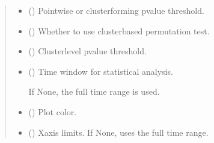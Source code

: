 \documentclass[letterpaper,10pt,english]{sphinxhowto}
\begin{document}
\begin{fulllineitems}
\begin{quote}
\begin{description}
\begin{itemize}
\item {} 
\sphinxAtStartPar
{} (\sphinxstyleliteralemphasis{\sphinxupquote{, }}) \textendash{} Point\sphinxhyphen{}wise or cluster\sphinxhyphen{}forming p\sphinxhyphen{}value threshold.

\item {} 
\sphinxAtStartPar
{} (\sphinxstyleliteralemphasis{\sphinxupquote{, }}) \textendash{} Whether to use cluster\sphinxhyphen{}based permutation test.

\item {} 
\sphinxAtStartPar
{} (\sphinxstyleliteralemphasis{\sphinxupquote{, }}) \textendash{} Cluster\sphinxhyphen{}level p\sphinxhyphen{}value threshold.

\item {} 
\sphinxAtStartPar
{} (\sphinxstyleliteralemphasis{\sphinxupquote{, }}) \textendash{} 
\sphinxAtStartPar
Time window for statistical analysis.

\sphinxAtStartPar
If None, the full time range is used.


\item {} 
\sphinxAtStartPar
{} (\sphinxstyleliteralemphasis{\sphinxupquote{, }}) \textendash{} Plot color.

\item {} 
\sphinxAtStartPar
{} (\sphinxstyleliteralemphasis{\sphinxupquote{, }}) \textendash{} X\sphinxhyphen{}axis limits. If None, uses the full time range.


\end{itemize}
\end{description}
\end{quote}
\end{fulllineitems}
\end{document}
